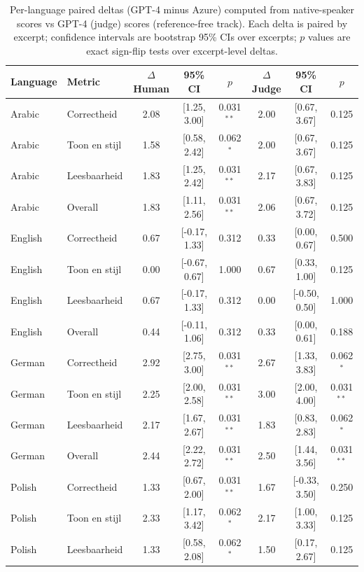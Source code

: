 \begin{table}[htbp]
\centering
\scriptsize
\renewcommand{\arraystretch}{1.15}
\setlength{\tabcolsep}{5pt}
\caption{Per-language paired deltas (GPT-4 minus Azure) computed from native-speaker scores vs GPT-4 (judge) scores (reference-free track). Each delta is paired by excerpt; confidence intervals are bootstrap 95\% CIs over excerpts; $p$ values are exact sign-flip tests over excerpt-level deltas.}
\label{tab:ref-free-deltas-by-language-human-vs-judge}
\begin{tabular}{@{}l l c c c c c c@{}}
\toprule
Language & Metric & $\Delta$ Human & 95\% CI & $p$ & $\Delta$ Judge & 95\% CI & $p$ \\
\midrule
Arabic & Correctheid & 2.08 & [1.25, 3.00] & 0.031$^{**}$ & 2.00 & [0.67, 3.67] & 0.125 \\
Arabic & Toon en stijl & 1.58 & [0.58, 2.42] & 0.062$^{*}$ & 2.00 & [0.67, 3.67] & 0.125 \\
Arabic & Leesbaarheid & 1.83 & [1.25, 2.42] & 0.031$^{**}$ & 2.17 & [0.67, 3.83] & 0.125 \\
Arabic & Overall & 1.83 & [1.11, 2.56] & 0.031$^{**}$ & 2.06 & [0.67, 3.72] & 0.125 \\
English & Correctheid & 0.67 & [-0.17, 1.33] & 0.312 & 0.33 & [0.00, 0.67] & 0.500 \\
English & Toon en stijl & 0.00 & [-0.67, 0.67] & 1.000 & 0.67 & [0.33, 1.00] & 0.125 \\
English & Leesbaarheid & 0.67 & [-0.17, 1.33] & 0.312 & 0.00 & [-0.50, 0.50] & 1.000 \\
English & Overall & 0.44 & [-0.11, 1.06] & 0.312 & 0.33 & [0.00, 0.61] & 0.188 \\
German & Correctheid & 2.92 & [2.75, 3.00] & 0.031$^{**}$ & 2.67 & [1.33, 3.83] & 0.062$^{*}$ \\
German & Toon en stijl & 2.25 & [2.00, 2.58] & 0.031$^{**}$ & 3.00 & [2.00, 4.00] & 0.031$^{**}$ \\
German & Leesbaarheid & 2.17 & [1.67, 2.67] & 0.031$^{**}$ & 1.83 & [0.83, 2.83] & 0.062$^{*}$ \\
German & Overall & 2.44 & [2.22, 2.72] & 0.031$^{**}$ & 2.50 & [1.44, 3.56] & 0.031$^{**}$ \\
Polish & Correctheid & 1.33 & [0.67, 2.00] & 0.031$^{**}$ & 1.67 & [-0.33, 3.50] & 0.250 \\
Polish & Toon en stijl & 2.33 & [1.17, 3.42] & 0.062$^{*}$ & 2.17 & [1.00, 3.33] & 0.125 \\
Polish & Leesbaarheid & 1.33 & [0.58, 2.08] & 0.062$^{*}$ & 1.50 & [0.17, 2.67] & 0.125 \\

\end{tabular}
\end{table}
